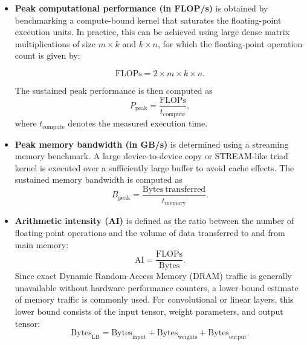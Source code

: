 \documentclass[12pt,a4paper]{report}
\begin{document}
    \begin{itemize}
        \item \textbf{Peak computational performance (in FLOP/s)} is obtained by benchmarking a compute-bound kernel that
        saturates the floating-point execution units.
        In practice, this can be achieved using large dense matrix multiplications
        of size $m \times k$ and $k \times n$, for which the floating-point operation count is given by:

            \begin{equation}
                \mathrm{FLOPs} = 2 \times m \times k \times n.
            \end{equation}

        The sustained peak performance is then computed as
            \begin{equation}
            P_{\mathrm{peak}} = \frac{\mathrm{FLOPs}}{t_{\mathrm{compute}}},
            \end{equation}
        where $t_{\mathrm{compute}}$ denotes the measured execution time.
        \item \textbf{Peak memory bandwidth (in GB/s)} is determined using a streaming memory
        benchmark. A large device-to-device copy or STREAM-like triad kernel is executed
        over a sufficiently large buffer to avoid cache effects. The sustained memory
        bandwidth is computed as
        \begin{equation}
        B_{\mathrm{peak}} = \frac{\mathrm{Bytes\ transferred}}{t_{\mathrm{memory}}}.
        \end{equation}
        \item \textbf{Arithmetic intensity (AI)} is defined as the ratio between the number of floating-point
        operations and the volume of data transferred to and from main memory:
        \begin{equation}
        \mathrm{AI} = \frac{\mathrm{FLOPs}}{\mathrm{Bytes}}.
        \end{equation}
        Since exact Dynamic Random-Access Memory (DRAM) traffic is generally unavailable without hardware performance counters, a lower-bound
        estimate of memory traffic is commonly used. For convolutional or linear layers, this lower bound
        consists of the input tensor, weight parameters, and output tensor:
        \begin{equation}
        \mathrm{Bytes}_{\mathrm{LB}} =
        \mathrm{Bytes}_{\mathrm{input}} +
        \mathrm{Bytes}_{\mathrm{weights}} +
        \mathrm{Bytes}_{\mathrm{output}}.

\end{equation}
\end{itemize}
\end{document}
